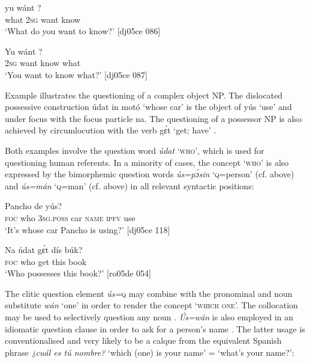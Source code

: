 \ea%
    \label{ex:key:600}
    \gll {}  yu  wánt  ?\\
what  \textsc{2sg}  want  know\\

\glt ‘What do you want to know?’ [dj05ce 086]
\z


\ea%
    \label{ex:key:601}
    \gll Yu  wánt      ?\\
\textsc{2sg}  want  know  what\\

\glt ‘You want to know what?’ [dj05ce 087]
\z

Example  illustrates the questioning of a complex object NP. The dislocated possessive construction{\fff} údat in motó ‘whose car’ is the object of yús ‘use’ and under focus with the focus particle na. The questioning of a possessor NP is also achieved by circumlocution with the verb gɛ́t ‘get; have’ . 


Both examples involve the question word \textit{údat} ‘\textsc{who’}, which is used for questioning human referents. In a minority of cases, the concept ‘\textsc{who’} is also expressed by the bimorphemic question words \textit{ús=pɔ́sin} ‘\textsc{q}=person’ (cf.  above) and \textit{ús=mán} ‘\textsc{q}=man’ (cf.  above) in all relevant syntactic positions: 



\ea%
    \label{ex:key:602}
    \gll {}          Pancho  de  yús?\\
\textsc{foc}  who    \textsc{3sg.poss}  car    \textsc{name}  \textsc{ipfv}  use\\

\glt ‘It’s whose car Pancho is using?’ [dj05ce 118]
\z


\ea%
    \label{ex:key:603}
    \gll Na  údat  gɛ́t  dís  búk?\\
\textsc{foc}  who    get  this  book\\

\glt ‘Who possesses this book?’ [ro05de 054]
\z

The clitic question element \textit{ús=}\textsc{q}\textit{} may combine with the pronominal and noun substitute \textit{wán} ‘one’ in order to render the concept ‘\textsc{which} \textsc{one’.} The collocation may be used to selectively question any noun . \textit{\'{U}s=wán} is also employed in an idiomatic question clause in order to ask for a person’s name . The latter usage is conventionalised and very likely to be a calque from the equivalent Spanish phrase \textit{¿cuál es tú nombre?} ‘which (one) is your name’ = ‘what’s your name?’:


